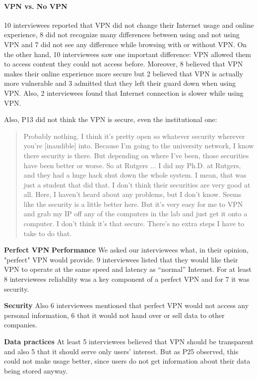 \paragraph{VPN vs. No VPN} 10 interviewees reported that VPN did not change their
Internet usage and online experience, 8 did not recognize many differences
between using and not using VPN and 7 did not see any difference while
browsing with or without VPN. On the other hand, 10 interviewees saw one
important difference: VPN allowed them to access content they could not access
before. Moreover, 8 believed that VPN makes their online experience more
secure but 2 believed that VPN is actually more vulnerable and 3 admitted that
they left their guard down when using VPN. Also, 2 interviewees found that
Internet connection is slower while using VPN. 



Also, P13 did not think the VPN is secure, even the institutional one:
\begin{quote}Probably nothing. I think it's pretty open so whatever security
wherever you're [inaudible] into. Because I'm going to the university network,
I know there security is there. But depending on where I've been, those
securities have been better or worse. So at Rutgers ... I did my Ph.D. at
Rutgers, and they had a huge hack shut down the whole system. I mean, that was
just a student that did that. I don't think their securities are very good at
all. Here, I haven't heard about any problems, but I don't know. Seems like
the security is a little better here. But it's very easy for me to VPN and
grab my IP off any of the computers in the lab and just get it onto a
computer. I don't think it's that secure. There's no extra steps I have to
take to do that.\end{quote}



\textbf{Perfect VPN} \textbf{Performance} We asked our interviewees what, in
their opinion, "perfect" VPN would provide. 9 interviewees listed that they
would like their VPN to operate at the same speed and latency as  “normal”
Internet. For at least 8 interviewees reliability was a key component of a
perfect VPN and for 7 it was security. 

\textbf{Security} Also 6 interviewees mentioned that perfect VPN would not
access any personal information, 6 that it would not hand over or sell data to
other companies. 

\textbf{Data practices} At least 5 interviewees believed that VPN should be
transparent and also 5 that it should serve only users' interest. But as P25
observed, this could not make usage better, since users do not get information
about their data being stored anyway.


